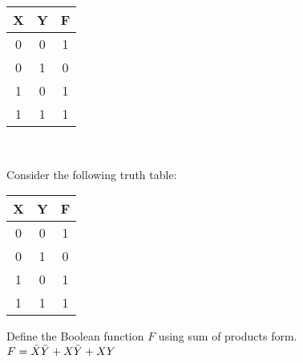 \begin{frame}[fragile]
\begin{tcolorbox}
{\begin{center}
		\begin{tabular}{cc|c}
		X&Y & F \\\hline
		0&0 & 1  \\
		0&1 & 0  \\
		1&0 & 1 \\
		1&1 & 1 \\
		\end{tabular}
		\end{center}	
  }
 \end{tcolorbox}   

\BNotes\ifnum{}
~%
\fi\ENotes
\end{frame}

\ifnum{}
\begin{frame}[label=handout, fragile]

\begin{tcolorbox}[enhanced,attach boxed title to top center={yshift=-3mm,yshifttext=-1mm},
  colback=red!5!white,colframe=red!75!black,colbacktitle=red!80!black,
  title=Try this,fonttitle=\bfseries,
  boxed title style={size=small,colframe=red!50!black} ]
 Consider the following truth table:
\begin{center}
		\begin{tabular}{cc|c}
		X&Y & F \\\hline
		0&0 & 1  \\
		0&1 & 0  \\
		1&0 & 1 \\
		1&1 & 1 \\
		\end{tabular}
		\end{center}	
   Define the Boolean function $F$ using sum of products form.   \\
    {\color{red} $F = \Bar{X}\Bar{Y}+X\Bar{Y}+XY$}
  

\end{tcolorbox}
\end{frame}
